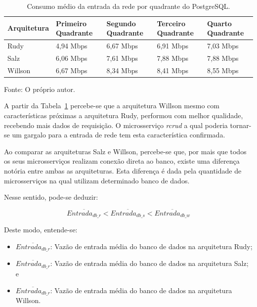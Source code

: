 \begin{table}[htb!]
\centering
\begin{adjustbox}{max width=\textwidth}
\caption{Consumo médio da entrada da rede por quadrante do PostgreSQL.}
\label{tab:net_in_db_media_quadrantes}

\begin{tabular}{l|l|l|l|l}
\hline \hline
Arquitetura & Primeiro Quadrante & Segundo Quadrante & Terceiro Quadrante & Quarto Quadrante \\ \hline \hline
Rudy        & 4,94 Mbps            & 6,67 Mbps           & 6,91 Mbps            & 7,03 Mbps          \\ \hline
Salz        & 6,06 Mbps            & 7,61 Mbps           & 7,88 Mbps            & 7,88 Mbps          \\ \hline
Willson     & 6,67 Mbps            & 8,34 Mbps          & 8,41 Mbps            & 8,55 Mbps          \\ \hline \hline
\end{tabular}
\end{adjustbox}

Fonte: O próprio autor.
\end{table}

A partir da Tabela~\ref{tab:net_in_db_media_quadrantes} percebe-se que a arquitetura Willson mesmo com características próximas a arquitetura Rudy, performou com melhor qualidade, recebendo mais dados de requisição.
%
O microsserviço \textit{rcrud} a qual poderia tornar-se um gargalo para a entrada de rede tem esta característica confirmada.

Ao comparar as arquiteturas Salz e Willson, percebe-se que, por mais que todos os seus microsserviços realizam conexão direta ao banco, existe uma diferença notória entre ambas as arquiteturas.
%
Esta diferença é dada pela quantidade de microsserviços na qual utilizam determinado banco de dados.

Nesse sentido, pode-se deduzir:

$$
    \overline{Entrada_{db\_r}} < \overline{Entrada_{db\_s}} < \overline{Entrada_{db\_w}}
$$

Deste modo, entende-se:

\begin{itemize}
 \item $\overline{Entrada_{db\_r}}$: Vazão de entrada média do banco de dados na arquitetura Rudy;
 \item $\overline{Entrada_{db\_r}}$: Vazão de entrada média do banco de dados na arquitetura Salz; e
 \item $\overline{Entrada_{db\_r}}$: Vazão de entrada média do banco de dados na arquitetura Willson.
\end{itemize}

